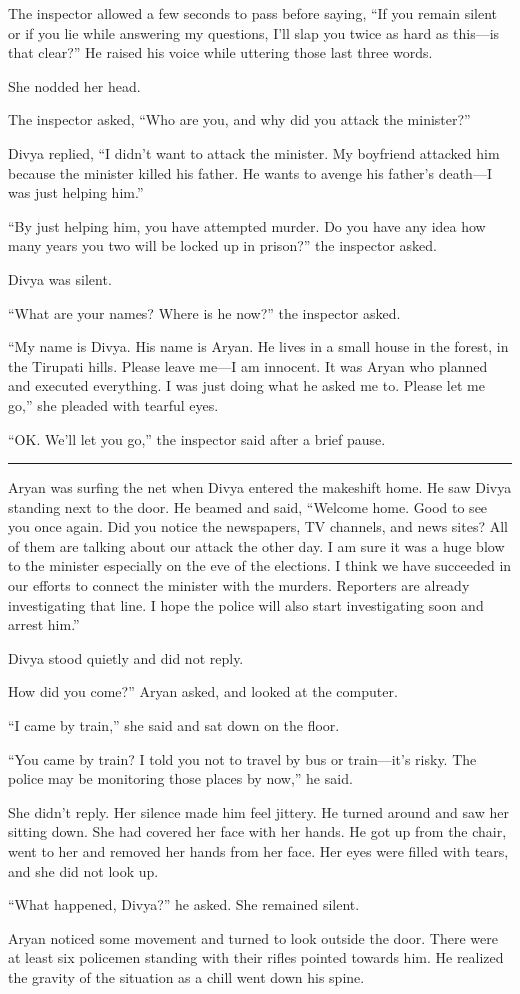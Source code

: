The inspector allowed a few seconds to pass before saying, “If you remain
silent or if you lie while answering my questions, I'll slap you twice as hard
as this—is that clear?” He raised his voice while uttering those last three
words.

She nodded her head.

The inspector asked, “Who are you, and why did you attack the minister?”

Divya replied, “I didn't want to attack the minister. My boyfriend attacked him
because the minister killed his father. He wants to avenge his father's death—I
was just helping him.”

“By just helping him, you have attempted murder. Do you have any idea how many
years you two will be locked up in prison?” the inspector asked.

Divya was silent.

“What are your names? Where is he now?” the inspector asked.

“My name is Divya. His name is Aryan. He lives in a small house in the forest, in
the Tirupati hills. Please leave me—I am innocent. It was Aryan who planned
and executed everything. I was just doing what he asked me to. Please let me
go,” she pleaded with tearful eyes.

“OK. We'll let you go,” the inspector said after a brief pause.

\fancybreak{* * *}

Aryan was surfing the net when Divya entered the makeshift home. He saw Divya
standing next to the door. He beamed and said, “Welcome home. Good to see you
once again. Did you notice the newspapers, TV channels, and news sites? All of
them are talking about our attack the other day. I am sure it was a huge blow
to the minister especially on the eve of the elections. I think we have succeeded in our
efforts to connect the minister with the murders. Reporters are already
investigating that line. I hope the police will also start investigating soon
and arrest him.”

Divya stood quietly and did not reply.

How did you come?” Aryan asked, and looked at the computer.

“I came by train,” she said and sat down on the floor.

“You came by train? I told you not to travel by bus or train—it's risky. The
police may be monitoring those places by now,” he said.

She didn't reply. Her silence made him feel jittery. He turned around and saw
her sitting down. She had covered her face with her hands. He got up from the
chair, went to her and removed her hands from her face. Her eyes were filled
with tears, and she did not look up.

“What happened, Divya?” he asked. She remained silent.

Aryan noticed some movement and turned to look outside the door. There were
at least six policemen standing with their rifles pointed towards him. He
realized the gravity of the situation as a chill went down his spine.
